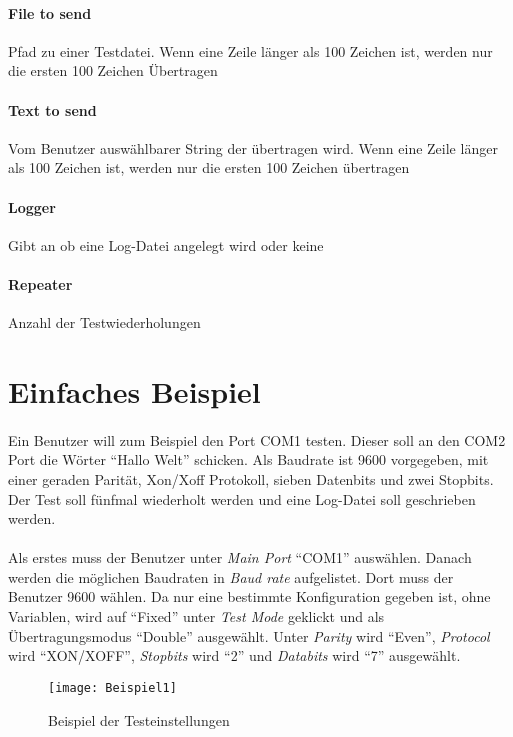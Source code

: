 \paragraph{File to send} Pfad zu einer Testdatei. Wenn eine Zeile länger als 100 Zeichen ist, werden nur die ersten 100 Zeichen Übertragen
\paragraph{Text to send} Vom Benutzer auswählbarer String der übertragen wird. Wenn eine Zeile länger als 100 Zeichen ist, werden nur die ersten 100 Zeichen übertragen
\paragraph{Logger} Gibt an ob eine Log-Datei angelegt wird oder keine
\paragraph{Repeater} Anzahl der Testwiederholungen


\section{Einfaches Beispiel}
\paragraph{}
Ein Benutzer will zum Beispiel den Port COM1 testen. Dieser soll an den COM2 Port die Wörter "`Hallo Welt"' schicken. Als Baudrate ist 9600 vorgegeben, mit einer geraden Parität, Xon/Xoff Protokoll, sieben Datenbits und zwei Stopbits. Der Test soll fünfmal wiederholt werden und eine Log-Datei soll geschrieben werden.

\paragraph{}
Als erstes muss der Benutzer unter \textit{Main Port} "`COM1"' auswählen. Danach werden die möglichen Baudraten in \textit{Baud rate} aufgelistet. Dort muss der Benutzer 9600 wählen. Da nur eine bestimmte Konfiguration gegeben ist, ohne Variablen, wird auf "`Fixed"' unter \textit{Test Mode} geklickt und als Übertragungsmodus "`Double"' ausgewählt. Unter \textit{Parity} wird "`Even"', \textit{Protocol} wird "`XON/XOFF"', \textit{Stopbits} wird "`2"' und \textit{Databits} wird "`7"' ausgewählt.\\

\begin{figure}[h]
  \begin{center}		%
    \texttt{[image: Beispiel1]}
  		  \caption{Beispiel der Testeinstellungen}
     \label{Beispielbild 1}
  \end{center}
\end{figure}

